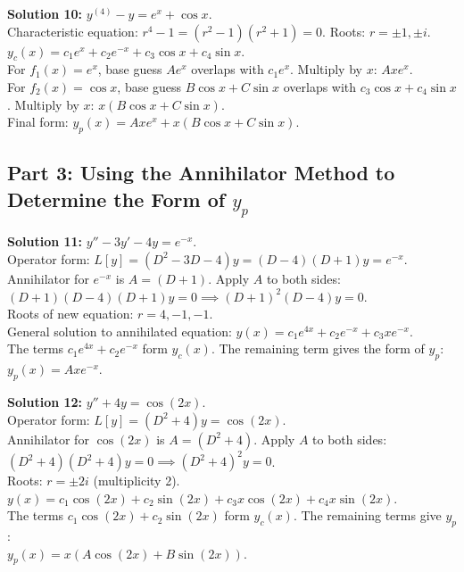 \documentclass[11pt]{article}
\begin{document}
\textbf{Solution 10:} $y^{(4)} - y = e^x + \cos x$. \\
Characteristic equation: $r^4 - 1 = (r^2-1)(r^2+1) = 0$. Roots: $r = \pm 1, \pm i$. \\
$y_c(x) = c_1 e^x + c_2 e^{-x} + c_3 \cos x + c_4 \sin x$. \\
For $f_1(x) = e^x$, base guess $A e^x$ overlaps with $c_1 e^x$. Multiply by $x$: $A x e^x$. \\
For $f_2(x) = \cos x$, base guess $B \cos x + C \sin x$ overlaps with $c_3 \cos x + c_4 \sin x$. Multiply by $x$: $x(B \cos x + C \sin x)$. \\
Final form: $y_p(x) = A x e^x + x(B \cos x + C \sin x)$.

\subsection*{Part 3: Using the Annihilator Method to Determine the Form of $y_p$}

\textbf{Solution 11:} $y'' - 3y' - 4y = e^{-x}$. \\
Operator form: $L[y] = (D^2 - 3D - 4)y = (D-4)(D+1)y = e^{-x}$. \\
Annihilator for $e^{-x}$ is $A = (D+1)$. Apply $A$ to both sides: \\
$(D+1)(D-4)(D+1)y = 0 \implies (D+1)^2(D-4)y = 0$. \\
Roots of new equation: $r = 4, -1, -1$. \\
General solution to annihilated equation: $y(x) = c_1 e^{4x} + c_2 e^{-x} + c_3 x e^{-x}$. \\
The terms $c_1 e^{4x} + c_2 e^{-x}$ form $y_c(x)$. The remaining term gives the form of $y_p$: \\
$y_p(x) = A x e^{-x}$.

\textbf{Solution 12:} $y'' + 4y = \cos(2x)$. \\
Operator form: $L[y] = (D^2 + 4)y = \cos(2x)$. \\
Annihilator for $\cos(2x)$ is $A = (D^2 + 4)$. Apply $A$ to both sides: \\
$(D^2 + 4)(D^2 + 4)y = 0 \implies (D^2 + 4)^2 y = 0$. \\
Roots: $r = \pm 2i$ (multiplicity 2). \\
$y(x) = c_1 \cos(2x) + c_2 \sin(2x) + c_3 x \cos(2x) + c_4 x \sin(2x)$. \\
The terms $c_1 \cos(2x) + c_2 \sin(2x)$ form $y_c(x)$. The remaining terms give $y_p$: \\
$y_p(x) = x(A \cos(2x) + B \sin(2x))$.
\end{document}
